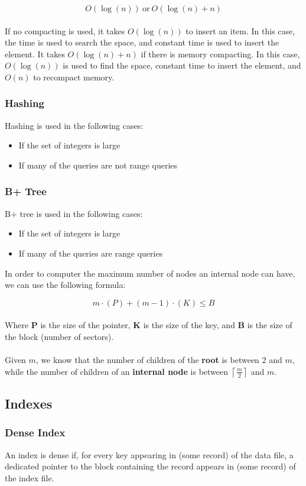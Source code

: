 \documentclass{article}
\begin{document}
\[ O(\log(n))~\text{or}~O(\log(n) + n) \] \\
If no compacting is used, it takes $O(\log(n))$ to insert an item. In this case, the time is used to search the space, and constant time is used to insert the element. It takes $O(\log(n) + n)$ if there is memory compacting. In this case, $O(\log(n))$ is used to find the space, constant time to insert the element, and $O(n)$ to recompact memory.

\subsubsection{Hashing}
Hashing is used in the following cases:

\begin{itemize}
	\item If the set of integers is large
	\item If many of the queries are not range queries
\end{itemize}

\subsubsection{B+ Tree}
B+ tree is used in the following cases:

\begin{itemize}
	\item If the set of integers is large
	\item If many of the queries are range queries
\end{itemize}
In order to computer the maximum number of nodes an internal node can have, we can use the following formula:

\[ m \cdot (P) + (m-1) \cdot (K) \leq B \] \\
Where \textbf{P} is the size of the pointer, \textbf{K} is the size of the key, and \textbf{B} is the size of the block (number of sectors). \\ \\
Given $m$, we know that the number of children of the \textbf{root} is between 2 and $m$, while the number of children of an \textbf{internal node} is between $\left\lceil\frac{m}{2}\right\rceil$ and $m$.

\subsection{Indexes}
\subsubsection{Dense Index}
An index is dense if, for every key appearing in (some record) of the data file, a dedicated pointer to the block containing the record appears in (some record) of the index file.
\end{document}
